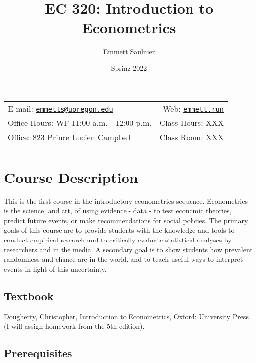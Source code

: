 \documentclass[11pt,]{article}
\title{EC 320: Introduction to Econometrics}
\author{Emmett Saulnier}
\date{Spring 2022}
\begin{document}
  

		\maketitle
		
	
		\thispagestyle{firststyle}



	\noindent \begin{tabular*}{\textwidth}{ @{\extracolsep{\fill}} lr @{\extracolsep{\fill}}}


E-mail: \texttt{\href{mailto:emmetts@uoregon.edu}{\nolinkurl{emmetts@uoregon.edu}}} & Web: \href{http://emmett.run}{\tt emmett.run}\\
Office Hours: WF 11:00 a.m. - 12:00 p.m.  &  Class Hours: XXX\\
Office: 823 Prince Lucien Campbell  & Class Room: XXX\\
	&  \\
	\hline
	\end{tabular*}
	
\vspace{2mm}
	


\hypertarget{course-description}{%
\section{Course Description}\label{course-description}}

This is the first course in the introductory econometrics sequence.
Econometrics is the science, and art, of using evidence - data - to test
economic theories, predict future events, or make recommendations for
social policies. The primary goals of this course are to provide
students with the knowledge and tools to conduct empirical research and
to critically evaluate statistical analyses by researchers and in the
media. A secondary goal is to show students how prevalent randomness and
chance are in the world, and to teach useful ways to interpret events in
light of this uncertainty.

\hypertarget{textbook}{%
\subsection{Textbook}\label{textbook}}

Dougherty, Christopher, Introduction to Econometrics, Oxford: University
Press (I will assign homework from the 5th edition).

\hypertarget{prerequisites}{%
\subsection{Prerequisites}\label{prerequisites}}
\end{document}
